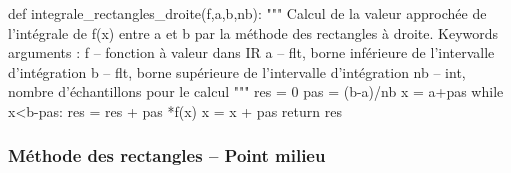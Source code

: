 \documentclass[10pt]{article}
\begin{document}
\begin{py}
\begin{python}
def integrale_rectangles_droite(f,a,b,nb):
    """
    Calcul de la valeur approchée de l'intégrale de f(x) entre a et b par la 
    méthode des rectangles à droite.
    Keywords arguments :
    f -- fonction à valeur dans IR
    a -- flt, borne inférieure de l'intervalle d'intégration
    b -- flt, borne supérieure de l'intervalle d'intégration
    nb -- int, nombre d'échantillons pour le calcul
    """
    res = 0
    pas = (b-a)/nb
    x = a+pas
    while x<b-pas:
        res = res + pas *f(x)
        x = x + pas
    return res
\end{python}
\end{py}

\subsubsection{Méthode des rectangles -- Point milieu}
\end{document}
